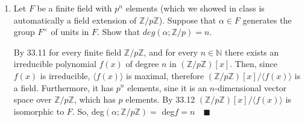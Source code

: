 \documentclass{article}
\newcommand\N{\mathbb{N}}
\newcommand\Z{\mathbb{Z}}
\begin{document}
\begin{enumerate}
\item Let $F$ be a finite field with $p^n$ elements (which we showed in class is automatically a field extension of $\Z/p\Z$). Suppose that $\alpha \in F$ generates the group $F^\times$ of units in $F$. Show that $deg(\alpha; \Z/p) = n$.


By 33.11 for every finite field $\Z/p\Z$, and for every $n\in \N$ there exists
an irreducible polynomial $f(x)$ of
degree $n$ in $(\Z/p\Z)[x]$. Then, since $f(x)$ is irreducible, $\langle f(x) \rangle$ is maximal,
therefore $(\Z/p\Z)[x]/\langle f(x) \rangle$ is a field. Furthermore,
it has $p^n$ elements, sine it is an $n$-dimensional vector space over
$\Z/p\Z$, which has $p$ elements. By 33.12 $(\Z/p\Z)[x]/\langle f(x)
\rangle$ is  isomorphic to $F$. So,
deg$(\alpha;\Z/p\Z) =$ deg$f = n\quad \blacksquare$

\end{enumerate}
\end{document}
